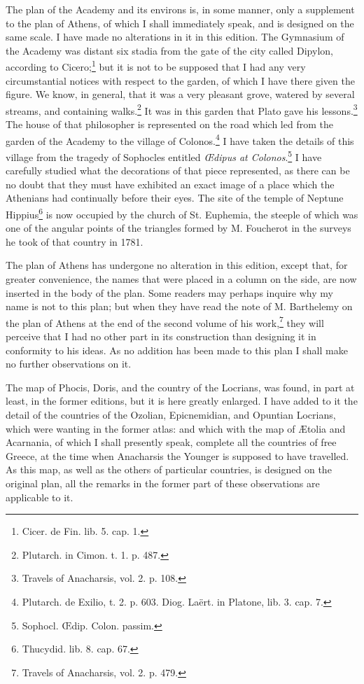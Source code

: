 \documentclass[a4paper, 11pt, oneside, polutonikogreek, english]{article}
\begin{document}
The plan of the Academy and its environs is, in some manner, only a supplement to the plan of Athens, of which I shall immediately speak, and is designed on the same scale. I have made no alterations in it in this edition. The Gymnasium of the Academy was distant six stadia from the gate of the city called Dipylon, according to Cicero;\footnote{Cicer. de Fin. lib. 5. cap. 1.} but it is not to be supposed that I had any very circumstantial notices with respect to the garden, of which I have there given the figure. We know, in general, that it was a very pleasant grove, watered by several streams, and containing walks.\footnote{Plutarch. in Cimon. t. 1. p. 487.} It was in this garden that Plato gave his lessons.\footnote{Travels of Anacharsis, vol. 2. p. 108.} The house of that philosopher is represented on the road which led from the garden of the Academy to the village of Colonos.\footnote{Plutarch. de Exilio, t. 2. p. 603. Diog. Laërt. in Platone, lib. 3. cap. 7.} I have taken the details of this village from the tragedy of Sophocles entitled \emph{Œdipus at Colonos}.\footnote{Sophocl. Œdip. Colon. passim.} I have carefully studied what the decorations of that piece represented, as there can be no doubt that they must have exhibited an exact image of a place which the Athenians had continually before their eyes. The site of the temple of Neptune Hippius\footnote{Thucydid. lib. 8. cap. 67.} is now occupied by the church of St. Euphemia, the steeple of which was one of the angular points of the triangles formed by M. Foucherot in the surveys he took of that country in 1781.

The plan of Athens has undergone no alteration in this edition, except that, for greater convenience, the names that were placed in a column on the side, are now inserted in the body of the plan. Some readers may perhaps inquire why my name is not to this plan; but when they have read the note of M. Barthelemy on the plan of Athens at the end of the second volume of his work,\footnote{Travels of Anacharsis, vol. 2. p. 479.} they will perceive that I had no other part in its construction than designing it in conformity to his ideas. As no addition has been made to this plan I shall make no further observations on it.

The map of Phocis, Doris, and the country of the Locrians, was found, in part at least, in the former editions, but it is here greatly enlarged. I have added to it the detail of the countries of the Ozolian, Epicnemidian, and Opuntian Locrians, which were wanting in the former atlas: and which with the map of Ætolia and Acarnania, of which I shall presently speak, complete all the countries of free Greece, at the time when Anacharsis the Younger is supposed to have travelled. As this map, as well as the others of particular countries, is designed on the original plan, all the remarks in the former part of these observations are applicable to it.
\end{document}
